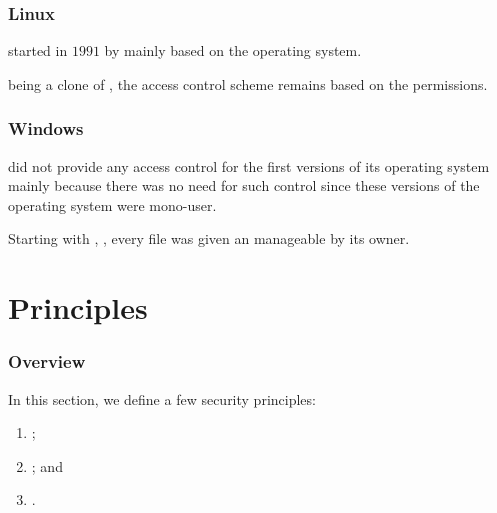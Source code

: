 
\begin{frame}
  \frametitle{Linux}

   started in $1991$ by  mainly based on
  the  operating system.

  \-

   being a clone of , the access control scheme
  remains based on the  permissions.
\end{frame}


\begin{frame}
  \frametitle{Windows}

   did not provide any access control for the first versions
  of its operating system mainly because there was no need for such control
  since these versions of the operating system were mono-user.

  \-

  Starting with  \ie{} , 
  \etc{}, every file was given an  manageable by
  its owner.
\end{frame}

%
%

\section{Principles}


\begin{frame}
  \frametitle{Overview}

  In this section, we define a few security principles:

  \begin{enumerate}
    \item
      ;
    \item
      ; and
    \item
      .
  \end{enumerate}
\end{frame}


